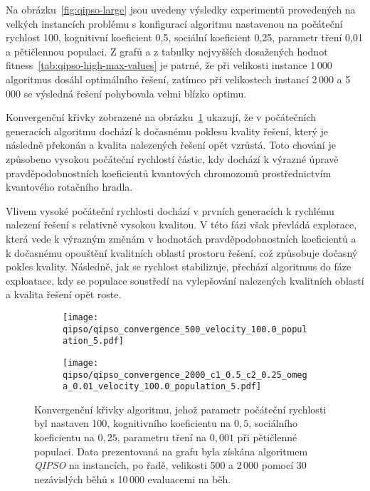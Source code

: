 Na obrázku~\ref{fig:qipso-large} jsou uvedeny výsledky experimentů provedených na velkých instancích problému s konfigurací algoritmu nastavenou na počáteční rychlost 100, kognitivní koeficient 0,5, sociální koeficient 0,25, parametr tření 0,01 a pětičlennou populaci.
Z grafů a z tabulky nejvyšších dosažených hodnot fitness~\ref{tab:qipso-high-max-values} je patrné, že při velikosti instance 1\,000 algoritmus dosáhl optimálního řešení, zatímco při velikostech instancí 2\,000 a 5\,000 se výsledná řešení pohybovala velmi blízko optimu. 

\newpage
Konvergenční křivky zobrazené na obrázku~\ref{fig:qipso-convergence} ukazují, že v počátečních generacích algoritmu dochází k dočasnému poklesu kvality řešení, který je následně překonán a kvalita nalezených řešení opět vzrůstá.  
Toto chování je způsobeno vysokou počáteční rychlostí částic, kdy dochází k výrazné úpravě pravděpodobnostních koeficientů kvantových chromozomů prostřednictvím kvantového rotačního hradla.

Vlivem vysoké počáteční rychlosti dochází v prvních generacích k rychlému nalezení řešení s relativně vysokou kvalitou. 
V této fázi však převládá explorace, která vede k výrazným změnám v hodnotách pravděpodobnostních koeficientů a k dočasnému opouštění kvalitních oblastí prostoru řešení, což způsobuje dočasný pokles kvality. Následně, jak se rychlost stabilizuje, přechází algoritmus do fáze exploatace, kdy se populace soustředí na vylepšování nalezených kvalitních oblastí a kvalita řešení opět roste.

\begin{figure}[ht!]
    \centering
    \begin{subfigure}[b]{0.48\textwidth}
      \texttt{[image: qipso/qipso\_convergence\_500\_velocity\_100.0\_population\_5.pdf]}
    \end{subfigure}
    \hfill
    \begin{subfigure}[b]{0.48\textwidth}
        \texttt{[image: qipso/qipso\_convergence\_2000\_c1\_0.5\_c2\_0.25\_omega\_0.01\_velocity\_100.0\_population\_5.pdf]}
    \end{subfigure}
    \caption{Konvergenční křivky algoritmu, jehož parametr počáteční rychlosti byl nastaven 100, kognitivního koeficientu na $0,5$, sociálního koeficientu na $0,25$, parametru tření na $0,001$ při pětičlenné populaci. Data prezentovaná na grafu byla získána algoritmem \emph{QIPSO} na instancích, po řadě, velikosti 500 a 2\,000 pomocí 30 nezávislých běhů s 10\,000 evaluacemi na běh.}
    \label{fig:qipso-convergence}
\end{figure}

